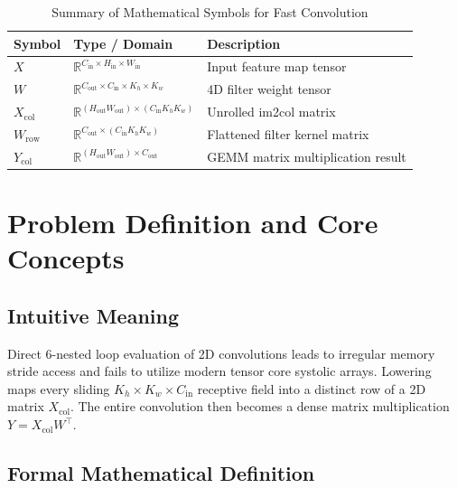 \documentclass[11pt,a4paper]{article}
\theoremstyle{definition}
\begin{document}
\begin{table}[h]
\centering
\caption{Summary of Mathematical Symbols for Fast Convolution}
\begin{tabular}{lll}
\toprule
\textbf{Symbol} & \textbf{Type / Domain} & \textbf{Description} \\
\midrule
$X$ & $\mathbb{R}^{C_{\text{in}} \times H_{\text{in}} \times W_{\text{in}}}$ & Input feature map tensor \\
$W$ & $\mathbb{R}^{C_{\text{out}} \times C_{\text{in}} \times K_h \times K_w}$ & 4D filter weight tensor \\
$X_{\text{col}}$ & $\mathbb{R}^{(H_{\text{out}} W_{\text{out}}) \times (C_{\text{in}} K_h K_w)}$ & Unrolled im2col matrix \\
$W_{\text{row}}$ & $\mathbb{R}^{C_{\text{out}} \times (C_{\text{in}} K_h K_w)}$ & Flattened filter kernel matrix \\
$Y_{\text{col}}$ & $\mathbb{R}^{(H_{\text{out}} W_{\text{out}}) \times C_{\text{out}}}$ & GEMM matrix multiplication result \\
\bottomrule
\end{tabular}
\end{table}

\section{Problem Definition and Core Concepts}

\subsection{Intuitive Meaning}
Direct 6-nested loop evaluation of 2D convolutions leads to irregular memory stride access and fails to utilize modern tensor core systolic arrays. Lowering maps every sliding $K_h \times K_w \times C_{\text{in}}$ receptive field into a distinct row of a 2D matrix $X_{\text{col}}$. The entire convolution then becomes a dense matrix multiplication $Y = X_{\text{col}} W^\top$.

\subsection{Formal Mathematical Definition}
\end{document}
